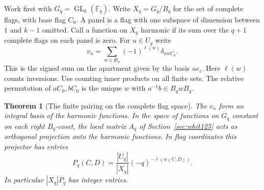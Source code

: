 \documentclass[a4paper,11pt]{article}
\newtheorem{theorem}[proposition]{Theorem}
\theoremstyle{definition}
\theoremstyle{remark}
\numberwithin{equation}{section}
\newcommand{\GL}{\operatorname{GL}}
\begin{document}
Work first with \(G_q=\GL_k(\mathbb F_q)\). Write
\(X_q=G_q/B_q\) for the set of complete flags, with base flag \(C_0\).
A panel is a flag with one subspace of dimension between \(1\) and
\(k-1\) omitted. Call a function on \(X_q\) harmonic if its sum over
the \(q+1\) complete flags on each panel is zero. For \(u\in U_q\)
write
\[
   v_u=\sum_{w\in\mathfrak S_k}(-1)^{\ell(w)}\delta_{uwC_0}.
\]
This is the signed sum on the apartment given by the basis \(u e_i\).
Here \(\ell(w)\) counts inversions. Use counting inner products on all
finite sets. The relative permutation of \(aC_0,bC_0\) is the unique
\(w\) with \(a^{-1}b\in B_q w B_q\).

\begin{theorem}[The finite pairing on the complete flag space]
\leavevmode\label{thm:flagprojector528}
The \(v_u\) form an integral basis of the harmonic functions. In the
space of functions on \(G_q\) constant on each right \(B_q\)-coset,
the local matrix \(A_q\) of Section~\ref{sec:whit125} acts as
orthogonal projection onto the harmonic functions. In flag coordinates
this projector has entries
\[
 P_q(C,D)=\frac{|U_q|}{|X_q|}(-q)^{-\ell(w(C,D))}.
\]
In particular \(|X_q|P_q\) has integer entries.
\end{theorem}
\end{document}
